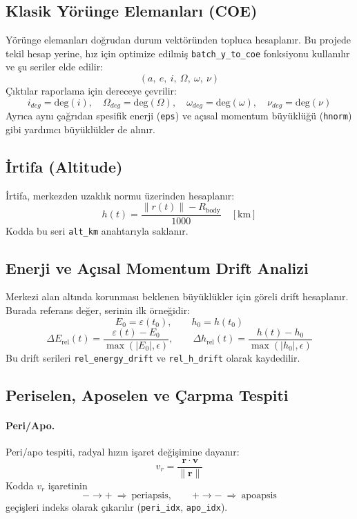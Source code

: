 \subsection*{Klasik Yörünge Elemanları (COE)}

Yörünge elemanları doğrudan durum vektöründen topluca hesaplanır.
Bu projede tekil hesap yerine, hız için optimize edilmiş
\texttt{batch\_y\_to\_coe} fonksiyonu kullanılır ve şu seriler elde edilir:
\[
(a,\ e,\ i,\ \Omega,\ \omega,\ \nu)
\]
Çıktılar raporlama için dereceye çevrilir:
\[
i_{deg}=\mathrm{deg}(i),\quad \Omega_{deg}=\mathrm{deg}(\Omega),\quad \omega_{deg}=\mathrm{deg}(\omega),\quad \nu_{deg}=\mathrm{deg}(\nu)
\]
Ayrıca aynı çağrıdan spesifik enerji (\texttt{eps}) ve açısal momentum büyüklüğü
(\texttt{hnorm}) gibi yardımcı büyüklükler de alınır. 


\subsection*{İrtifa (Altitude)}

İrtifa, merkezden uzaklık normu üzerinden hesaplanır:
\[
h(t)=\frac{ \|r(t)\| - R_\text{body} }{1000}
\quad [\mathrm{km}]
\]
Kodda bu seri \texttt{alt\_km} anahtarıyla saklanır. 


\subsection*{Enerji ve Açısal Momentum Drift Analizi}

Merkezi alan altında korunması beklenen büyüklükler için göreli drift hesaplanır.
Burada referans değer, serinin ilk örneğidir:
\[
E_0 = \varepsilon(t_0), \qquad h_0 = h(t_0)
\]
\[
\Delta E_\text{rel}(t)=\frac{\varepsilon(t)-E_0}{\max(|E_0|,\epsilon)},\qquad
\Delta h_\text{rel}(t)=\frac{h(t)-h_0}{\max(|h_0|,\epsilon)}
\]
Bu drift serileri \texttt{rel\_energy\_drift} ve \texttt{rel\_h\_drift} olarak kaydedilir. 


\subsection*{Periselen, Aposelen ve Çarpma Tespiti}

\paragraph{Peri/Apo.}
Peri/apo tespiti, radyal hızın işaret değişimine dayanır:
\[
v_r = \frac{\mathbf{r}\cdot\mathbf{v}}{\|\mathbf{r}\|}
\]
Kodda $v_r$ işaretinin
\[
-\rightarrow + \ \Rightarrow\ \text{periapsis},\qquad
+\rightarrow - \ \Rightarrow\ \text{apoapsis}
\]
geçişleri indeks olarak çıkarılır (\texttt{peri\_idx}, \texttt{apo\_idx}). 


